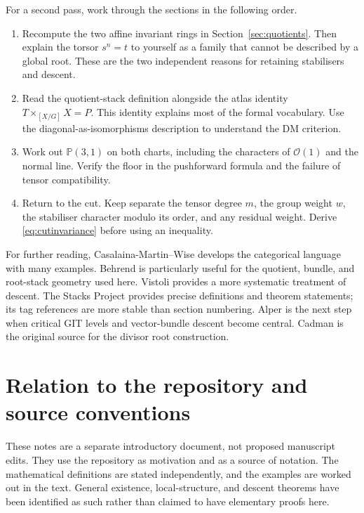 \documentclass[11pt,a4paper]{article}
\numberwithin{equation}{section}
\theoremstyle{definition}
\newcommand{\PP}{\mathbb P}
\newcommand{\OO}{\mathcal O}
\begin{document}
For a second pass, work through the sections in the following order.
\begin{enumerate}
\item Recompute the two affine invariant rings in Section~\ref{sec:quotients}.
Then explain the torsor $s^n=t$ to yourself as a family that cannot be
described by a global root. These are the two independent reasons for
retaining stabilisers and descent.
\item Read the quotient-stack definition alongside the atlas identity
$T\times_{[X/G]}X=P$. This identity explains most of the formal vocabulary.
Use the diagonal-as-isomorphisms description to understand the DM criterion.
\item Work out $\PP(3,1)$ on both charts, including the characters of
$\OO(1)$ and the normal line. Verify the floor in the pushforward formula
and the failure of tensor compatibility.
\item Return to the cut. Keep separate the tensor degree $m$, the group
weight $w$, the stabiliser character modulo its order, and any residual
weight. Derive \eqref{eq:cutinvariance} before using an inequality.
\end{enumerate}

For further reading, Casalaina-Martin--Wise \cite[\S\S2--6]{CMW} develops
the categorical language with many examples. Behrend
\cite[\S\S3.3--3.6]{Behrend} is particularly useful for the quotient,
bundle, and root-stack geometry used here. Vistoli \cite{Vistoli}
provides a more systematic treatment of descent. The Stacks Project
provides precise definitions and theorem statements; its tag references
are more stable than section numbering. Alper \cite{Alper} is the next
step when critical GIT levels and vector-bundle descent become central.
Cadman \cite{Cadman} is the original source for the divisor root construction.

\appendix
\section{Relation to the repository and source conventions}

These notes are a separate introductory document, not proposed manuscript
edits. They use the repository as motivation and as a source of notation.
The mathematical definitions are stated independently, and the examples
are worked out in the text. General existence, local-structure, and
descent theorems have been identified as such rather than claimed to
have elementary proofs here.
\end{document}
